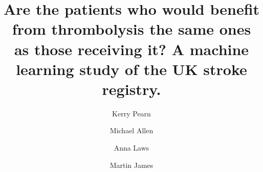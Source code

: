 \title{Are the patients who would benefit from thrombolysis the same ones as those receiving it? A machine learning study of the UK stroke registry.}


\renewcommand{\thefootnote}{\fnsymbol{footnote}}
\author[1,2]{Kerry Pearn}
\author[*1,2]{Michael Allen}
\author[1,2]{Anna Laws}
\author[1,2]{Martin James}


\date{}